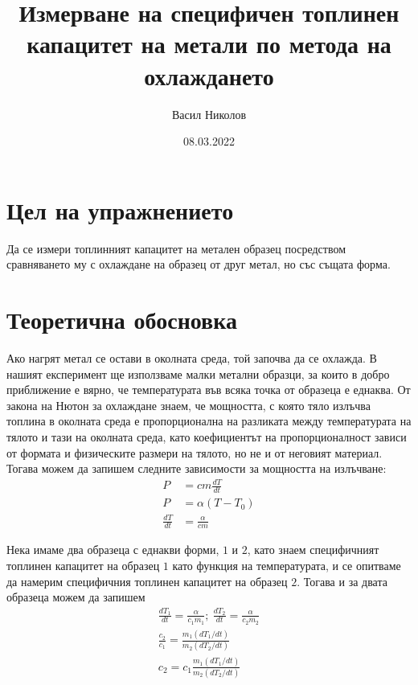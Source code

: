 \documentclass[
 reprint,
 amsmath,amssymb,
 aps,
]{revtex4-2}
\begin{document}
\setlength{\abovedisplayskip}{10pt}
\setlength{\belowdisplayskip}{10pt}    

\title{Измерване на специфичен топлинен капацитет на метали по метода на охлаждането}
\author{Васил Николов}
\date{08.03.2022}
\maketitle

\section{Цел на упражнението}

Да се измери топлинният капацитет на метален образец посредством сравняването му с охлаждане на образец от друг метал, но със същата форма. 

\section{Теоретична обосновка}

Ако нагрят метал се остави в околната среда, той започва да се охлажда. В нашият експеримент ще използваме малки метални образци, за които в добро приближение е вярно, че температурата във всяка точка от образеца е еднаква. От закона на Нютон за охлаждане знаем, че мощността, с която тяло излъчва топлина в околната среда е пропорционална на разликата между температурата на тялото и тази на околната среда, като коефициентът на пропорционалност зависи от формата и физическите размери на тялото, но не и от неговият материал. Тогава можем да запишем следните зависимости за мощността на излъчване:
\begin{align*}
    P &= cm\frac{dT}{dt} \\ 
    P &= \alpha (T - T_0) \\
    \frac{dT}{dt} &= \frac{\alpha}{cm}
\end{align*}

Нека имаме два образеца с еднакви форми, $1$ и $2$, като знаем специфичният топлинен капацитет на образец $1$ като функция на температурата, и се опитваме да намерим специфичния топлинен капацитет на образец $2$. Тогава и за двата образеца можем да запишем 
\begin{gather*} 
    \frac{dT_1}{dt} = \frac{\alpha}{c_1 m_1}; \  \frac{dT_2}{dt} = \frac{\alpha}{c_2 m_2} \\
    \frac{c_2}{c_1} = \frac{m_1 (dT_1/dt)}{m_2 (dT_2/dt)} \\
    c_2 = c_1 \frac{m_1 (dT_1/dt)}{m_2 (dT_2/dt)} \tag{1} \label{eq:1}
\end{gather*}
\end{document}
